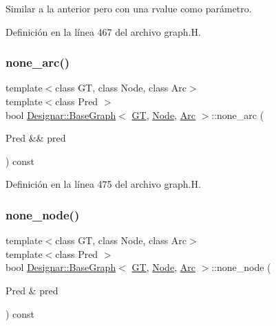 Similar a la anterior pero con una rvalue como parámetro. 



Definición en la línea 467 del archivo graph.\+H.

\mbox{\label{class_designar_1_1_base_graph_a69c4841b8c517a510d738bc1204da7b7}} 
\subsubsection{\texorpdfstring{none\+\_\+arc()}{none\_arc()}\hspace{0.1cm}{\footnotesize\ttfamily [2/2]}}
{\footnotesize\ttfamily template$<$class GT, class Node, class Arc$>$ \\
template$<$class Pred $>$ \\
bool \hyperlink{class_designar_1_1_base_graph}{Designar\+::\+Base\+Graph}$<$ \hyperlink{demo-buildgraph_8_c_a3001c40d2c31ca87ed96cd7d1334a55e}{GT}, \hyperlink{namespace_designar_a5af326c65aa2bd26b26c410f2030d09e}{Node}, \hyperlink{namespace_designar_a3f55fb5513d62ff47cbc8f72b8e95d6f}{Arc} $>$\+::none\+\_\+arc (\begin{DoxyParamCaption}\item[{Pred \&\&}]{pred }\end{DoxyParamCaption}) const\hspace{0.3cm}{\ttfamily [inline]}}



Definición en la línea 475 del archivo graph.\+H.

\mbox{\label{class_designar_1_1_base_graph_aa87c903e7fbf82a30edc9e442a115050}} 
\subsubsection{\texorpdfstring{none\+\_\+node()}{none\_node()}\hspace{0.1cm}{\footnotesize\ttfamily [1/2]}}
{\footnotesize\ttfamily template$<$class GT, class Node, class Arc$>$ \\
template$<$class Pred $>$ \\
bool \hyperlink{class_designar_1_1_base_graph}{Designar\+::\+Base\+Graph}$<$ \hyperlink{demo-buildgraph_8_c_a3001c40d2c31ca87ed96cd7d1334a55e}{GT}, \hyperlink{namespace_designar_a5af326c65aa2bd26b26c410f2030d09e}{Node}, \hyperlink{namespace_designar_a3f55fb5513d62ff47cbc8f72b8e95d6f}{Arc} $>$\+::none\+\_\+node (\begin{DoxyParamCaption}\item[{Pred \&}]{pred }\end{DoxyParamCaption}) const\hspace{0.3cm}{\ttfamily [inline]}}



